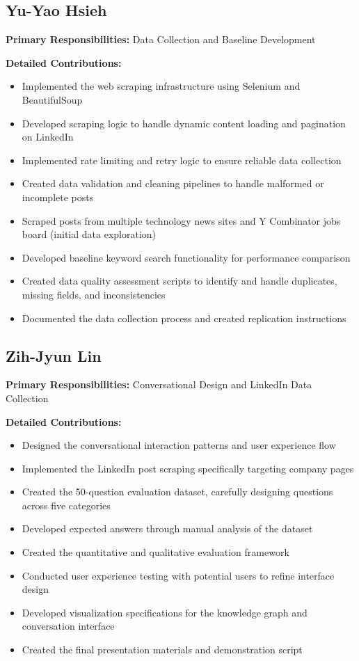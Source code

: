 \documentclass[11pt,twocolumn]{article}
\begin{document}
\subsection{Yu-Yao Hsieh}

\textbf{Primary Responsibilities:} Data Collection and Baseline Development

\textbf{Detailed Contributions:}
\begin{itemize}
\item Implemented the web scraping infrastructure using Selenium and BeautifulSoup
\item Developed scraping logic to handle dynamic content loading and pagination on LinkedIn
\item Implemented rate limiting and retry logic to ensure reliable data collection
\item Created data validation and cleaning pipelines to handle malformed or incomplete posts
\item Scraped posts from multiple technology news sites and Y Combinator jobs board (initial data exploration)
\item Developed baseline keyword search functionality for performance comparison
\item Created data quality assessment scripts to identify and handle duplicates, missing fields, and inconsistencies
\item Documented the data collection process and created replication instructions
\end{itemize}

\subsection{Zih-Jyun Lin}

\textbf{Primary Responsibilities:} Conversational Design and LinkedIn Data Collection

\textbf{Detailed Contributions:}
\begin{itemize}
\item Designed the conversational interaction patterns and user experience flow
\item Implemented the LinkedIn post scraping specifically targeting company pages
\item Created the 50-question evaluation dataset, carefully designing questions across five categories
\item Developed expected answers through manual analysis of the dataset
\item Created the quantitative and qualitative evaluation framework
\item Conducted user experience testing with potential users to refine interface design
\item Developed visualization specifications for the knowledge graph and conversation interface
\item Created the final presentation materials and demonstration script
\end{itemize}
\end{document}
